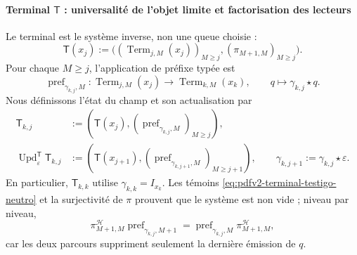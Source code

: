 \paragraph{Terminal \(\mathsf T\) : universalité de l'objet limite et factorisation des lecteurs}
Le terminal est le système inverse, non une queue choisie :
\begin{equation}
\label{eq:pdfv2-terminal-sistema-inverso-campo}
 \mathsf T(x_j):=
 \bigl((\operatorname{Term}_{j,M}(x_j))_{M\geq j},
       (\pi_{M+1,M})_{M\geq j}\bigr).
\end{equation}
Pour chaque \(M\geq j\), l'application de préfixe typée est
\begin{equation}
\label{eq:pdfv2-terminal-update-t}
 \operatorname{pref}_{\gamma_{k,j},M}:
 \operatorname{Term}_{j,M}(x_j)\longrightarrow
 \operatorname{Term}_{k,M}(x_k),\qquad
 q\longmapsto\gamma_{k,j}\star q.
\end{equation}
Nous définissons l'état du champ et son actualisation par
\begin{align}
 \mathsf T_{k,j}
 &:=
 \left(\mathsf T(x_j),
   (\operatorname{pref}_{\gamma_{k,j},M})_{M\geq j}\right),
 \label{eq:pdfv2-terminal-estado-t}\\
 \operatorname{Upd}^{\mathsf T}_{\varepsilon}\mathsf T_{k,j}
 &:=
 \left(\mathsf T(x_{j+1}),
   (\operatorname{pref}_{\gamma_{k,j+1},M})_{M\geq j+1}\right),
 \qquad \gamma_{k,j+1}:=\gamma_{k,j}\star\varepsilon.
 \label{eq:pdfv2-terminal-update-t-explicita}
\end{align}
En particulier, \(\mathsf T_{k,k}\) utilise \(\gamma_{k,k}=I_{x_k}\). Les témoins \eqref{eq:pdfv2-terminal-testigo-neutro} et la surjectivité de \(\pi\) prouvent que le système est non vide ; niveau par niveau,
\begin{equation}
\label{eq:pdfv2-terminal-prefijo-natural}
 \pi^{\mathscr H}_{M+1,M}
 \operatorname{pref}_{\gamma_{k,j},M+1}
 =\operatorname{pref}_{\gamma_{k,j},M}
  \pi^{\mathscr H}_{M+1,M},
\end{equation}
car les deux parcours suppriment seulement la dernière émission de \(q\).

